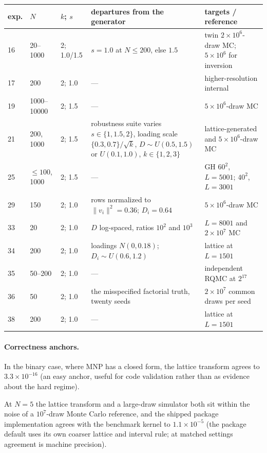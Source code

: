 \documentclass[12pt]{article}
\theoremstyle{remark}
\begin{document}
\begin{center}
\footnotesize
\setlength{\tabcolsep}{4pt}
\renewcommand{\arraystretch}{1.15}
\begin{tabular}{lllp{4.6cm}p{3.4cm}}
\toprule
exp. & $N$ & $k$; $s$ & departures from the generator & targets / reference \\
\midrule
16 & 20--1000 & 2; 1.0/1.5 & $s = 1.0$ at $N \le 200$, else $1.5$ & twin $2{\times}10^6$-draw MC; $5{\times}10^6$ for inversion \\
17 & 200 & 2; 1.0 & --- & higher-resolution internal \\
19 & 1000--10000 & 2; 1.5 & --- & $5{\times}10^6$-draw MC \\
21 & 200, 1000 & 2; 1.5 & robustness suite varies $s \in \{1, 1.5, 2\}$, loading scale $\{0.3, 0.7\}/\sqrt{k}$, $D \sim U(0.5,1.5)$ or $U(0.1,1.0)$, $k \in \{1,2,3\}$ & lattice-generated and $5{\times}10^6$-draw MC \\
25 & $\le100$, 1000 & 2; 1.5 & --- & GH $60^2$, $L{=}5001$; $40^2$, $L{=}3001$ \\
29 & 150 & 2; 1.0 & rows normalized to $\|v_i\|^2 = 0.36$; $D_i = 0.64$ & $5{\times}10^6$-draw MC \\
33 & 20 & 2; 1.0 & $D$ log-spaced, ratios $10^2$ and $10^3$ & $L = 8001$ and $2{\times}10^7$ MC \\
34 & 200 & 2; 1.0 & loadings $N(0, 0.18)$; $D_i \sim U(0.6, 1.2)$ & lattice at $L = 1501$ \\
35 & 50--200 & 2; 1.0 & --- & independent RQMC at $2^{17}$ \\
36 & 50 & 2; 1.0 & the misspecified factorial truth, twenty seeds & $2{\times}10^7$ common draws per seed \\
38 & 200 & 2; 1.0 & --- & lattice at $L = 1501$ \\
\bottomrule
\end{tabular}
\end{center}

\paragraph{Correctness anchors.} In the binary case, where MNP has a
closed form, the lattice transform agrees to $3.3\times10^{-16}$ (an easy
anchor, useful for code validation rather than as evidence about the hard
regime).

At $N=5$ the lattice transform and a large-draw simulator both sit
within the noise of a $10^7$-draw Monte Carlo reference, and the shipped
package implementation agrees with the benchmark kernel to
$1.1\times10^{-5}$ (the package default uses its own coarser lattice
and interval rule; at matched settings agreement is machine precision).
\end{document}

